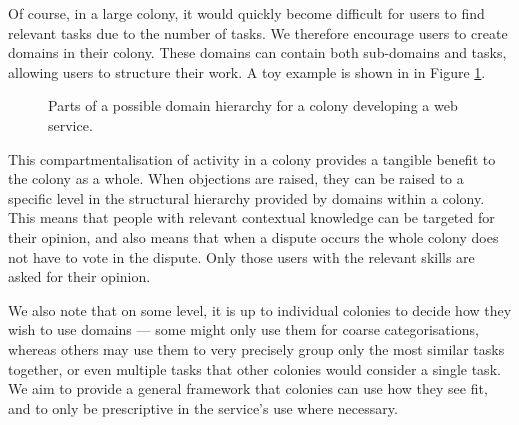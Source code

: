 Of course, in a large colony, it would quickly become difficult for users to find relevant tasks due to the number of tasks. We therefore encourage users to create domains in their colony. These domains can contain both sub-domains and tasks, allowing users to structure their work. A toy example is shown in in Figure \ref{fig:domainhierarchysample}. 

\begin{figure}[h]
    \centering
 \caption{Parts of a possible domain hierarchy for a colony developing a web service.}
 \label{fig:domainhierarchysample}

\end{figure}

This compartmentalisation of activity in a colony provides a tangible benefit to the colony as a whole. When objections are raised, they can be raised to a specific level in the structural hierarchy provided by domains within a colony. This means that people with relevant contextual knowledge can be targeted for their opinion, and also means that when a dispute occurs the whole colony does not have to vote in the dispute. Only those users with the relevant skills are asked for their opinion.

We also note that on some level, it is up to individual colonies to decide how they wish to use domains --- some might only use them for coarse categorisations, whereas others may use them to very precisely group only the most similar tasks together, or even multiple tasks that other colonies would consider a single task. We aim to provide a general framework that colonies can use how they see fit, and to only be prescriptive in the service's use where necessary.

